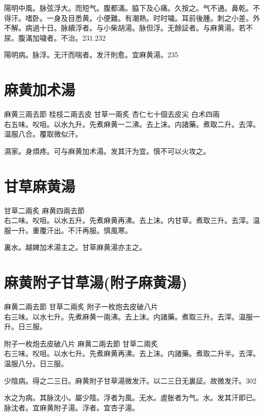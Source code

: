 陽明中風。脉弦浮大。而短气。腹都滿。脇下及心痛。久按之。气不通。鼻乾。不得汗。嗜卧。一身及目悉黄。小便難。有潮熱。时时噦。耳前後腫。刺之小差。外不解。病過十日。脉續浮者。与{\khaaitp 小}柴胡湯。脉但浮。无餘証者。与麻黄湯。若不尿。腹滿加噦者。不治。231.232

陽明病。脉浮。无汗而喘者。发汗則愈。宜麻黄湯。235

\section{麻黄加术湯}

麻黄{\scriptsize 三兩去節} 桂枝{\scriptsize 二兩去皮} 甘草{\scriptsize 一兩炙} 杏仁{\scriptsize 七十個去皮尖} 白术{\scriptsize 四兩}\\
右五味。㕮咀。以水九升。先煮麻黄一二沸。去上沫。内諸藥。煮取二升。去滓。温服八合。覆取微似汗。

濕家。身煩疼。可与麻黄加术湯。发其汗为宜。慎不可以火攻之。

\section{甘草麻黄湯}

甘草{\scriptsize 二兩炙} 麻黄{\scriptsize 四兩去節}\\
右二味。㕮咀。以水五升。先煮麻黄{\khaaitp 再沸}。去上沫。内甘草。煮取三升。去滓。温服一升。重覆汗出。不汗再服。慎風寒。

裏水。越婢加术湯主之。甘草麻黄湯亦主之。

\section{麻黄附子甘草湯(附子麻黄湯)}

麻黄{\scriptsize 二兩去節} 甘草{\scriptsize 二兩炙} 附子{\scriptsize 一枚炮去皮破八片}\\
右三味。以水七升。先煮麻黄一兩沸。去上沫。内諸藥。煮取三升。去滓。温服一升。日三服。{\zhaoben}

附子{\scriptsize 一枚炮去皮破八片} 麻黄{\scriptsize 二兩去節} 甘草{\scriptsize 二兩炙}\\
右三味。㕮咀。以水七升。先煮麻黄再沸。去上沫。内諸藥。煮取二升半。去滓。温服八分。日三服。{\wuben}

少陰病。得之二三日。麻黄附子甘草湯微发汗。以二三日无{\khaaitp 裏}証。故微发汗。302

水之为病。其脉沈小。屬少陰。浮者为風。无水。虗胀者为气。水。发其汗即已。脉沈者。宜麻黄附子湯。浮者。宜杏子湯。

